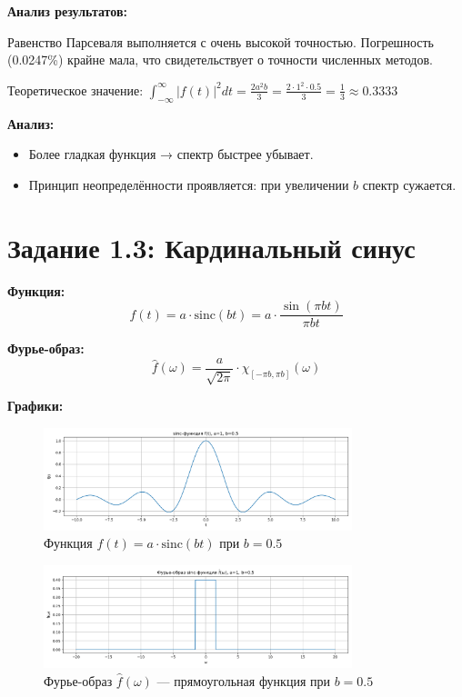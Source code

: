 \textbf{Анализ результатов:}

Равенство Парсеваля выполняется с очень высокой точностью. Погрешность (0.0247\%) крайне мала, что свидетельствует о точности численных методов.

Теоретическое значение: $\displaystyle \int_{-\infty}^{\infty} |f(t)|^2 dt = \frac{2 a^2 b}{3} = \frac{2 \cdot 1^2 \cdot 0.5}{3} = \frac{1}{3} \approx 0.3333$

\textbf{Анализ:}

\begin{itemize}
    \item Более гладкая функция → спектр быстрее убывает.
    \item Принцип неопределённости проявляется: при увеличении $b$ спектр сужается.
\end{itemize}

\section*{Задание 1.3: Кардинальный синус}

\textbf{Функция:}
\[
f(t) = a \cdot \mathrm{sinc}(bt) = a \cdot \frac{\sin(\pi b t)}{\pi b t}
\]

\textbf{Фурье-образ:}
\[
\hat{f}(\omega) = \frac{a}{\sqrt{2\pi}} \cdot \chi_{[-\pi b, \pi b]}(\omega)
\]

\textbf{Графики:}

\begin{figure}[H]
    \centering
    \includegraphics[width=0.8\textwidth]{sinc_function_b0.5.png}
    \caption{Функция $f(t) = a \cdot \mathrm{sinc}(bt)$ при $b = 0.5$}
\end{figure}

\begin{figure}[H]
    \centering
    \includegraphics[width=0.8\textwidth]{sinc_spectrum_b0.5.png}
    \caption{Фурье-образ $\hat{f}(\omega)$ — прямоугольная функция при $b = 0.5$}
\end{figure}

